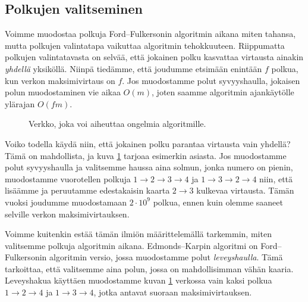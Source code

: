 \subsection{Polkujen valitseminen}

Voimme muodostaa polkuja Ford–Fulkersonin algoritmin aikana miten tahansa,
mutta polkujen valintatapa vaikuttaa algoritmin tehokkuuteen.
Riippumatta polkujen valintatavasta on selvää,
että jokainen polku kasvattaa virtausta ainakin \emph{yhdellä} yksiköllä.
Niinpä tiedämme, että joudumme etsimään enintään $f$ polkua,
kun verkon maksimivirtaus on $f$.
Jos muodostamme polut syvyyshaulla,
jokaisen polun muodostaminen vie aikaa $O(m)$,
joten saamme algoritmin ajankäytölle ylärajan $O(fm)$.

\begin{figure}
\center
\begin{center}
\end{center}
\caption{Verkko, joka voi aiheuttaa ongelmia algoritmille.}
\label{fig:polhuo}
\end{figure}

Voiko todella käydä niin, että jokainen polku parantaa
virtausta vain yhdellä?
Tämä on mahdollista, ja kuva \ref{fig:polhuo} tarjoaa esimerkin asiasta.
Jos muodostamme polut syvyyshaulla ja valitsemme haussa aina solmun,
jonka numero on pienin,
muodostamme vuorotellen polkuja $1 \rightarrow 2 \rightarrow 3 \rightarrow 4$
ja $1 \rightarrow 3 \rightarrow 2 \rightarrow 4$ niin, että
lisäämme ja peruutamme edestakaisin kaarta $2 \rightarrow 3$ kulkevaa virtausta.
Tämän vuoksi joudumme muodostamaan $2 \cdot 10^9$ polkua,
ennen kuin olemme saaneet selville verkon maksimivirtauksen.


Voimme kuitenkin estää tämän ilmiön määrittelemällä tarkemmin,
miten valitsemme polkuja algoritmin aikana.
Edmonds–Karpin algoritmi on Ford–Fulkersonin algoritmin versio,
jossa muodostamme polut \emph{leveyshaulla}.
Tämä tarkoittaa, että valitsemme aina
polun, jossa on mahdollisimman vähän kaaria.
Leveyshakua käyttäen muodostamme kuvan \ref{fig:polhuo} verkossa
vain kaksi polkua $1 \rightarrow 2 \rightarrow 4$ ja
$1 \rightarrow 3 \rightarrow 4$, jotka antavat suoraan maksimivirtauksen.

